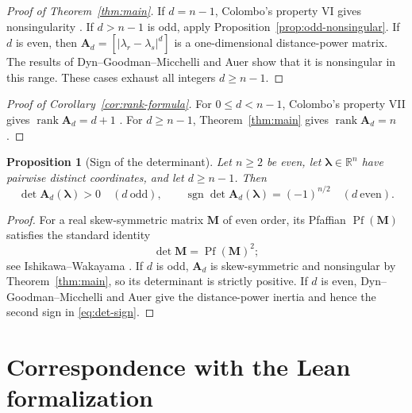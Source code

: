 \documentclass[11pt,letterpaper,reqno]{amsart}
\numberwithin{equation}{section}
\newtheorem{proposition}[theorem]{Proposition}
\theoremstyle{definition}
\newcommand{\RR}{\mathbb{R}}
\newcommand{\rank}{\operatorname{rank}}
\newcommand{\Pf}{\operatorname{Pf}}
\newcommand{\Mat}[1]{\mathbf{#1}}
\newcommand{\vct}[1]{\boldsymbol{#1}}
\begin{document}
\begin{proof}[Proof of Theorem~\ref{thm:main}]
If \(d=n-1\), Colombo's property VI gives nonsingularity
\cite[pp.~35--36]{Colombo1928}.  If \(d>n-1\) is odd, apply
Proposition~\ref{prop:odd-nonsingular}.  If \(d\) is even, then
\(\Mat{A}_d=[|\lambda_r-\lambda_s|^d]\) is a one-dimensional
distance-power matrix.  The results of Dyn--Goodman--Micchelli
\cite{DynGoodmanMicchelli1986} and Auer \cite{Auer1998} show that it is
nonsingular in this range.  These cases exhaust all integers
\(d\ge n-1\).
\end{proof}

\begin{proof}[Proof of Corollary~\ref{cor:rank-formula}]
For \(0\le d<n-1\), Colombo's property VII gives
\(\rank\Mat{A}_d=d+1\) \cite[pp.~35--36]{Colombo1928}.  For
\(d\ge n-1\), Theorem~\ref{thm:main} gives
\(\rank\Mat{A}_d=n\).
\end{proof}

\begin{proposition}[Sign of the determinant]\label{prop:det-sign}
Let \(n\ge2\) be even, let \(\vct{\lambda}\in\RR^n\) have pairwise
distinct coordinates, and let \(d\ge n-1\).  Then
\begin{equation}\label{eq:det-sign}
 \det \Mat{A}_d(\vct{\lambda})>0\quad(d\ \text{odd}),
 \qquad
 \operatorname{sgn}\det \Mat{A}_d(\vct{\lambda})=(-1)^{n/2}
 \quad(d\ \text{even}).
\end{equation}
\end{proposition}

\begin{proof}
For a real skew-symmetric matrix \(\Mat M\) of even order, its Pfaffian
\(\Pf(\Mat M)\) satisfies the standard identity
\[
 \det\Mat M=\Pf(\Mat M)^2;
\]
see Ishikawa--Wakayama \cite[\S2]{IshikawaWakayama1995}.  If \(d\) is
odd, \(\Mat{A}_d\) is skew-symmetric and nonsingular by
Theorem~\ref{thm:main}, so its determinant is strictly positive.  If
\(d\) is even, Dyn--Goodman--Micchelli
\cite{DynGoodmanMicchelli1986} and Auer \cite{Auer1998} give the
distance-power inertia and hence the second sign in
\eqref{eq:det-sign}.
\end{proof}

\appendix

\section{Correspondence with the Lean formalization}
\label{app:lean-map}
\end{document}
